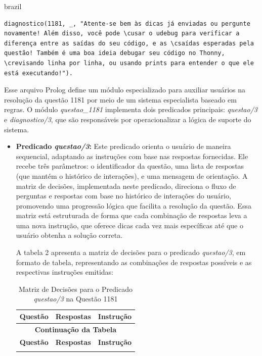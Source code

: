 \begin{otherlanguage*}{brazil}
\begin{lstlisting}[style=ufscthesisx_style, caption={Arquivo \textit{questao\_1181.pl}}]
    diagnostico(1181, _, "Atente-se bem às dicas já enviadas ou pergunte novamente! Além disso, você pode \cusar o udebug para verificar a diferença entre as saídas do seu código, e as \csaídas esperadas pela questão! Também é uma boa ideia debugar seu código no Thonny, \crevisando linha por linha, ou usando prints para entender o que ele está executando!").
\end{lstlisting}    

Esse arquivo Prolog define um módulo especializado para auxiliar usuários na resolução da questão 1181 por meio de um sistema especialista baseado em regras. O módulo \textit{questao\_1181} implementa dois predicados principais: \textit{questao/3} e \textit{diagnostico/3}, que são responsáveis por operacionalizar a lógica de suporte do sistema.

\begin{itemize}
    \item \textbf{Predicado \textit{questao/3}:} Este predicado orienta o usuário de maneira sequencial, adaptando as instruções com base nas respostas fornecidas. Ele recebe três parâmetros: o identificador da questão, uma lista de respostas (que mantém o histórico de interações), e uma mensagem de orientação. A matriz de decisões, implementada neste predicado, direciona o fluxo de perguntas e respostas com base no histórico de interações do usuário, promovendo uma progressão lógica que facilita a resolução da questão. Essa matriz está estruturada de forma que cada combinação de respostas leva a uma nova instrução, que oferece dicas cada vez mais específicas até que o usuário obtenha a solução correta.

    A tabela 2 apresenta a matriz de decisões para o predicado \textit{questao/3}, em formato de tabela, representando as combinações de respostas possíveis e as respectivas instruções emitidas:

    \begin{longtable}{|c|p{5cm}|p{8cm}|}
        \caption{Matriz de Decisões para o Predicado \textit{questao/3} na Questão 1181} \\
        \hline
        \textbf{Questão} & \textbf{Respostas} & \textbf{Instrução} \\
        \hline
        \endfirsthead
        \multicolumn{3}{|c|}{\textbf{Continuação da Tabela}} \\
        \hline
        \textbf{Questão} & \textbf{Respostas} & \textbf{Instrução} \\
        \hline
        \endhead
        \hline
        \endfoot
        \hline
        \endlastfoot
        

\end{longtable}
\end{itemize}
\end{otherlanguage*}

